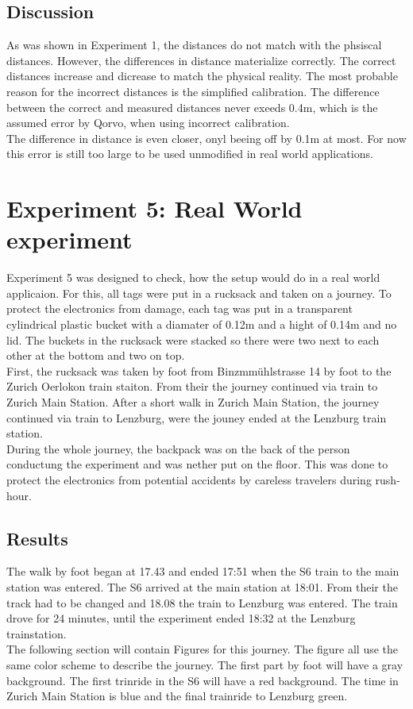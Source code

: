 \subsection{Discussion}
\label{s:exp_4_conclusion}
As was shown in Experiment 1, the distances do not match with the phsiscal distances.
However, the differences in distance materialize correctly.
The correct distances increase and dicrease to match the physical reality.
The most probable reason for the incorrect distances is the simplified calibration.
The difference between the correct and measured distances never exeeds 0.4m, which is the assumed error by Qorvo, when using incorrect calibration.\\
The difference in distance is even closer, onyl beeing off by 0.1m at most.
For now this error is still too large to be used unmodified in real world applications.


\section{Experiment 5: Real World experiment}
\label{s:exp_5_real_world}
Experiment 5 was designed to check, how the setup would do in a real world applicaion.
For this, all tags were put in a rucksack and taken on a journey.
To protect the electronics from damage, each tag was put in a transparent cylindrical plastic bucket with a diamater of 0.12m and a hight of 0.14m and no lid.
The buckets in the rucksack were stacked so there were two next to each other at the bottom and two on top.\\
First, the rucksack was taken by foot from Binzmmühlstrasse 14 by foot to the Zurich Oerlokon train staiton.
From their the journey continued via train to Zurich Main Station.
After a short walk in Zurich Main Station, the journey continued via train to Lenzburg, were the jouney ended at the Lenzburg train station. \\
During the whole journey, the backpack was on the back of the person conductung the experiment and was nether put on the floor.
This was done to protect the electronics from potential accidents by careless travelers during rush-hour.

\subsection{Results}
\label{s:exp5_real_worl_results}
The walk by foot began at 17.43 and ended 17:51 when the S6 train to the main station was entered.
The S6 arrived at the main station at 18:01.
From their the track had to be changed and 18.08 the train to Lenzburg was entered.
The train drove for 24 minutes, until the experiment ended 18:32 at the Lenzburg trainstation.\\
The following section will contain Figures for this journey.
The figure all use the same color scheme to describe the journey.
The first part by foot will have a gray background.
The first trinride in the S6 will have a red background.
The time in Zurich Main Station is blue and the final trainride to Lenzburg green.

